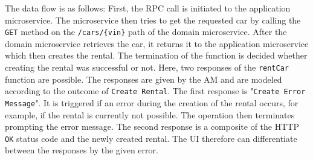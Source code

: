 The data flow is as follows:
First, the RPC call is initiated to the application microservice.
The microservice then tries to get the requested car by calling the \texttt{GET} method on the \texttt{/cars/\{vin\}} path of the domain microservice.
After the domain microservice retrieves the car, it returns it to the application microservice which then creates the rental.
The termination of the function is decided whether creating the rental was successful or not. 
Here, two responses of the \texttt{rentCar} function are possible.
The responses are given by the AM and are modeled according to the outcome of \texttt{Create Rental}.
The first response is "\texttt{Create Error Message}".
It is triggered if an error during the creation of the rental occurs, for example, if the rental is currently not possible.
The operation then terminates prompting the error message.
The second response is a composite of the HTTP \texttt{OK} status code and the newly created rental. 
The UI therefore can differentiate between the responses by the given error.
